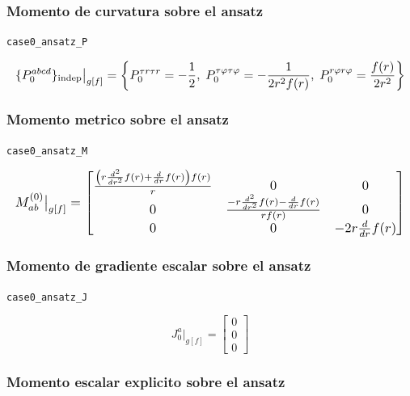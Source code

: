 \documentclass[11pt,a4paper]{article}
\begin{document}
\subsubsection{Momento de curvatura sobre el ansatz}

\noindent\texttt{case0\_ansatz\_P}\par\nopagebreak[4]

\[
\resizebox{\textwidth}{!}{$\displaystyle \{P_0^{abcd}\}_{\mathrm{indep}}\big|_{g[f]} = \left\{P_0^{{\tau}{r}{\tau}{r}}=- \frac{1}{2},\;P_0^{{\tau}{\varphi}{\tau}{\varphi}}=- \frac{1}{2 r^{2} f{\left(r \right)}},\;P_0^{{r}{\varphi}{r}{\varphi}}=\frac{f{\left(r \right)}}{2 r^{2}}\right\}$}
\]

\subsubsection{Momento metrico sobre el ansatz}

\noindent\texttt{case0\_ansatz\_M}\par\nopagebreak[4]

\[
\resizebox{\textwidth}{!}{$\displaystyle M^{(0)}_{ab}\big|_{g[f]} = \left[\begin{matrix}\frac{\left(r \frac{d^{2}}{d r^{2}} f{\left(r \right)} + \frac{d}{d r} f{\left(r \right)}\right) f{\left(r \right)}}{r} & 0 & 0\\0 & \frac{- r \frac{d^{2}}{d r^{2}} f{\left(r \right)} - \frac{d}{d r} f{\left(r \right)}}{r f{\left(r \right)}} & 0\\0 & 0 & - 2 r \frac{d}{d r} f{\left(r \right)}\end{matrix}\right]$}
\]

\subsubsection{Momento de gradiente escalar sobre el ansatz}

\noindent\texttt{case0\_ansatz\_J}\par\nopagebreak[4]

\[
J_0^a\big|_{g[f]} = \left[\begin{matrix}0\\0\\0\end{matrix}\right]
\]

\subsubsection{Momento escalar explicito sobre el ansatz}
\end{document}
